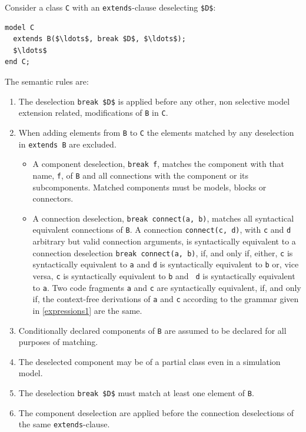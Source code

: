 Consider a class \lstinline!C! with an \lstinline!extends!-clause deselecting \lstinline!$D$!:
\begin{lstlisting}[language=modelica]
model C
  extends B($\ldots$, break $D$, $\ldots$);
  $\ldots$
end C;
\end{lstlisting}
The semantic rules are:
\begin{enumerate}
\item
  The deselection \lstinline!break $D$! is applied before any other, non selective model extension related, modifications of \lstinline!B! in \lstinline!C!.
\item
  When adding elements from \lstinline!B! to \lstinline!C! the elements matched by any deselection in \lstinline!extends B! are excluded.
  \begin{itemize}
  \item
    A component deselection, \lstinline!break f!, matches the component with that name, \lstinline!f!, of \lstinline!B! and all connections with the  component or its subcomponents.
    Matched components must be models, blocks or connectors.
  \item
    A connection deselection, \lstinline!break connect(a, b)!, matches all syntactical equivalent connections of \lstinline!B!.
    A connection \lstinline!connect(c, d)!, with \lstinline!c! and \lstinline!d! arbitrary but valid connection arguments, is syntactically equivalent  to a connection deselection \lstinline!break connect(a, b)!, if, and only if, either, \lstinline!c! is syntactically equivalent to \lstinline!a! and   \lstinline!d! is syntactically equivalent to \lstinline!b! or, vice versa, \lstinline!c! is syntactically equivalent to \lstinline!b! and \lstinline! d! is syntactically equivalent to \lstinline!a!.
    Two code fragments \lstinline!a! and \lstinline!c! are syntactically equivalent, if, and only if, the context-free derivations of \lstinline!a! and \lstinline!c! according to the grammar given in \cref{expressions1} are the same.
  \end{itemize}
\item
  Conditionally declared components of \lstinline!B! are assumed to be declared for all purposes of matching.
\item
  The deselected component may be of a partial class even in a simulation model.
\item
  The deselection \lstinline!break $D$! must match at least one element of \lstinline!B!.
\item
  The component deselection are applied before the connection deselections of the same \lstinline!extends!-clause.
\end{enumerate}

